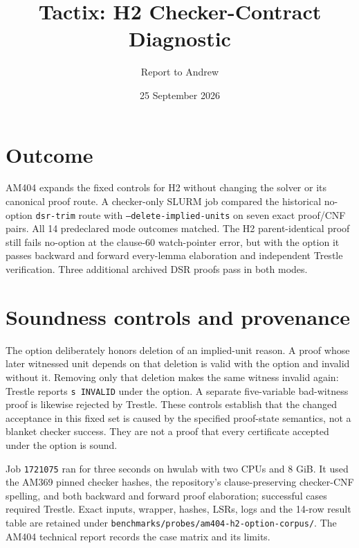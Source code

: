 \documentclass[11pt]{article}
\title{Tactix: H2 Checker-Contract Diagnostic}
\author{Report to Andrew}
\date{25 September 2026}
\newcommand{\code}[1]{\texttt{#1}}
\begin{document}
\maketitle
\vspace{-1.4em}

\section*{Outcome}
AM404 expands the fixed controls for H2 without changing the solver or its canonical proof route. A checker-only SLURM job compared the historical no-option \code{dsr-trim} route with \code{--delete-implied-units} on seven exact proof/CNF pairs. All 14 predeclared mode outcomes matched. The H2 parent-identical proof still fails no-option at the clause-60 watch-pointer error, but with the option it passes backward and forward every-lemma elaboration and independent Trestle verification. Three additional archived DSR proofs pass in both modes.

\section*{Soundness controls and provenance}
The option deliberately honors deletion of an implied-unit reason. A proof whose later witnessed unit depends on that deletion is valid with the option and invalid without it. Removing only that deletion makes the same witness invalid again: Trestle reports \code{s INVALID} under the option. A separate five-variable bad-witness proof is likewise rejected by Trestle. These controls establish that the changed acceptance in this fixed set is caused by the specified proof-state semantics, not a blanket checker success. They are not a proof that every certificate accepted under the option is sound.

Job \code{1721075} ran for three seconds on hwulab with two CPUs and 8 GiB. It used the AM369 pinned checker hashes, the repository's clause-preserving checker-CNF spelling, and both backward and forward proof elaboration; successful cases required Trestle. Exact inputs, wrapper, hashes, LSRs, logs and the 14-row result table are retained under \code{benchmarks/probes/am404-h2-option-corpus/}. The AM404 technical report records the case matrix and its limits.
\end{document}
